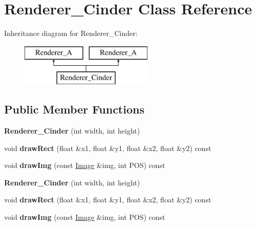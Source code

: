 \hypertarget{class_renderer___cinder}{\section{Renderer\-\_\-\-Cinder Class Reference}
\label{class_renderer___cinder}
}
Inheritance diagram for Renderer\-\_\-\-Cinder\-:\begin{figure}[H]
\begin{center}
\leavevmode
\includegraphics[height=2.000000cm]{class_renderer___cinder}
\end{center}
\end{figure}
\subsection*{Public Member Functions}
\begin{DoxyCompactItemize}
\item 
\hypertarget{class_renderer___cinder_af66dfa977f433a3fba7c74fd8afdb292}{{\bfseries Renderer\-\_\-\-Cinder} (int width, int height)}\label{class_renderer___cinder_af66dfa977f433a3fba7c74fd8afdb292}

\item 
\hypertarget{class_renderer___cinder_ae14f510b0f03226b9067ad11b3711c13}{void {\bfseries draw\-Rect} (float \&x1, float \&y1, float \&x2, float \&y2) const }\label{class_renderer___cinder_ae14f510b0f03226b9067ad11b3711c13}

\item 
\hypertarget{class_renderer___cinder_ad6700d502a42c60b2c97dd6e2b44b80a}{void {\bfseries draw\-Img} (const \hyperlink{class_image}{Image} \&img, int P\-O\-S) const }\label{class_renderer___cinder_ad6700d502a42c60b2c97dd6e2b44b80a}

\item 
\hypertarget{class_renderer___cinder_af66dfa977f433a3fba7c74fd8afdb292}{{\bfseries Renderer\-\_\-\-Cinder} (int width, int height)}\label{class_renderer___cinder_af66dfa977f433a3fba7c74fd8afdb292}

\item 
\hypertarget{class_renderer___cinder_ae14f510b0f03226b9067ad11b3711c13}{void {\bfseries draw\-Rect} (float \&x1, float \&y1, float \&x2, float \&y2) const }\label{class_renderer___cinder_ae14f510b0f03226b9067ad11b3711c13}

\item 
\hypertarget{class_renderer___cinder_ad6700d502a42c60b2c97dd6e2b44b80a}{void {\bfseries draw\-Img} (const \hyperlink{class_image}{Image} \&img, int P\-O\-S) const }\label{class_renderer___cinder_ad6700d502a42c60b2c97dd6e2b44b80a}

\end{DoxyCompactItemize}
